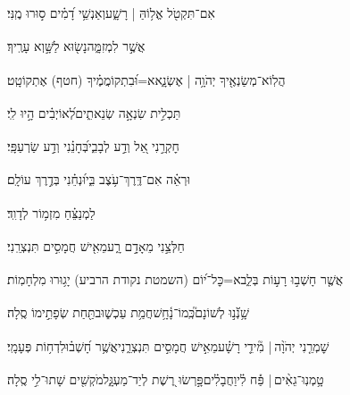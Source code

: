 \documentclass[12pt]{article}
\newcommand{\loc}[1]{\textsuperscript{\locf{#1}}}
\begin{document}
{\loc{ יט}~}‏אִם־תִּקְטֹ֖ל אֱל֥וֹהַּ | רָשָׁ֑ע{\hfill}וְאַנְשֵׁ֥י דָ֝מִ֗ים ס֣וּרוּ מֶֽנִּי׃\par

{\loc{ כ}~}‏אֲשֶׁ֣ר  לִמְזִמָּ֑ה{\hfill}נָשׂ֖וּא לַשָּׁ֣וְא עָרֶֽיךָ׃\par

{\loc{ כא}~}‏הֲלֽוֹא־מְשַׂנְאֶ֖יךָ יְהֹוָ֥ה | אֶשְׂנָ֑א{\hfill}א=וּ֝בִתְקוֹמֲמֶ֗יךָ (חטף) אֶתְקוֹטָֽט׃\par

{\loc{ כב}~}‏תַּכְלִ֣ית שִׂנְאָ֣ה שְׂנֵאתִ֑ים{\hfill}לְ֝אוֹיְבִ֗ים הָ֣יוּ לִֽי׃\par

{\loc{ כג}~}‏חׇקְרֵ֣נִי אֵ֭ל וְדַ֣ע לְבָבִ֑י{\hfill}בְּ֝חָנֵ֗נִי וְדַ֣ע שַׂרְעַפָּֽי׃\par

{\loc{ כד}~}‏וּרְאֵ֗ה אִם־דֶּֽרֶךְ־עֹ֥צֶב בִּ֑י{\hfill}וּ֝נְחֵ֗נִי בְּדֶ֣רֶךְ עוֹלָֽם׃\par\pend

\pstart[\subsection*{\textcolor{red}{פרק קמ}}]\label{פרק קמ}
{\loc{ א}~}‏לַמְנַצֵּ֗חַ מִזְמ֥וֹר לְדָוִֽד׃\par

{\loc{ ב}~}‏חַלְּצֵ֣נִי  מֵאָדָ֣ם רָ֑ע{\hfill}מֵאִ֖ישׁ חֲמָסִ֣ים תִּנְצְרֵֽנִי׃\par

{\loc{ ג}~}‏אֲשֶׁ֤ר חָשְׁב֣וּ רָע֣וֹת בְּלֵ֑ב{\hfill}א=כׇּל־י֝וֹם (השמטת נקודת הרביע) יָג֥וּרוּ מִלְחָמֽוֹת׃\par

{\loc{ ד}~}‏שָׁ֥נְﬞנ֣וּ לְשׁוֹנָם֮{\hfill}כְּֽמוֹ־נָ֫חָ֥שׁ\newline\hspace*{.5em}חֲמַ֥ת עַכְשׁ֑וּב{\hfill}תַּ֖חַת שְׂפָתֵ֣ימוֹ סֶֽלָה׃\par

{\loc{ ה}~}‏שׇׁמְרֵ֤נִי יְהֹוָ֨ה |  מִ֘ידֵ֤י רָשָׁ֗ע{\hfill}מֵאִ֣ישׁ חֲמָסִ֣ים תִּנְצְרֵ֑נִי\newline\hspace*{.5em}אֲשֶׁ֥ר חָ֝שְׁב֗וּ{\hfill}לִדְח֥וֹת פְּעָמָֽי׃\par

{\loc{ ו}~}‏טָ֥מְנֽוּ־גֵאִ֨ים |  פַּ֡ח לִ֗י{\hfill}וַחֲבָלִ֗ים\newline\hspace*{.5em}פָּ֣רְשׂוּ רֶ֭שֶׁת לְיַד־מַעְגָּ֑ל{\hfill}מֹקְשִׁ֖ים שָׁתוּ־לִ֣י סֶֽלָה׃\par
\end{document}
